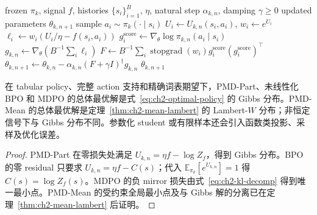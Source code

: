 \begin{algorithm}[ht]
\caption{MDPO natural-gradient inner update\\{\small\textit{Semantics: 最小化固定 history 的负 mirror objective}}}
\begin{algorithmic}[1]
\Require frozen $\pi_k$, signal $f$, histories $\{s_i\}_{i=1}^{B}$, $\eta$, natural step $\alpha_{k,n}$, damping $\gamma\ge0$
\Ensure updated parameters $\theta_{k,n+1}$
    \State sample $a_i\sim\pi_k(\cdot\mid s_i)$
    \State $U_i\gets U_{k,n}(s_i,a_i)$, $w_i\gets e^{U_i}$
    \State $\ell_i\gets w_i(U_i/\eta-f(s_i,a_i))$ 
    \State $g_i^{\mathrm{score}}\gets\nabla_\theta\log\pi_{k,n}(a_i\mid s_i)$
\EndFor
\State $g_{k,n}\gets\nabla_\theta(B^{-1}\sum_i\ell_i)$
\State $F\gets B^{-1}\sum_i\operatorname{stopgrad}(w_i)g_i^{\mathrm{score}}(g_i^{\mathrm{score}})^\top$
\State $\theta_{k,n+1}\gets\theta_{k,n}-\alpha_{k,n}(F+\gamma I)^\dagger g_{k,n}$
\State \Return $\theta_{k,n+1}$
\end{algorithmic}
\end{algorithm}

\begin{theorem}
\label{thm:ch2-inner-common-root}
在 tabular policy、完整 action 支持和精确词表期望下，PMD-Part、未线性化 BPO 和 MDPO 的总体最优解是式~\eqref{eq:ch2-optimal-policy} 的 Gibbs 分布。PMD-Mean 的总体最优解是定理~\ref{thm:ch2-mean-lambert} 的 Lambert-$W$ 分布；非恒定信号下与 Gibbs 分布不同。参数化 student 或有限样本还会引入函数类投影、采样及优化误差。
\end{theorem}

\begin{proof}
PMD-Part 在零损失处满足 $U_{k,n}=\eta f-\log Z_f$，得到 Gibbs 分布。BPO 的零 residual 只要求 $U_{k,n}=\eta f-C(s)$；代入 $\mathbb E_{\pi_k}[e^{U_{k,n}}]=1$ 得 $C(s)=\log Z_f(s)$。MDPO 的负 mirror 损失由式~\eqref{eq:ch2-kl-decomp} 得到唯一最小点。PMD-Mean 的受约束全局最小点及与 Gibbs 解的分离已在定理~\ref{thm:ch2-mean-lambert} 后证明。
\end{proof}

